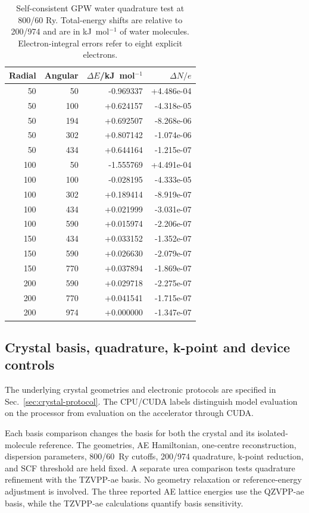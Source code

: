 \documentclass[10pt,a4paper]{article}
\begin{document}
\begin{table}[htbp]
\centering\small
\caption{Self-consistent GPW water quadrature test at 800/60 Ry. Total-energy shifts are relative to 200/974 and are in kJ~mol$^{-1}$ of water molecules. Electron-integral errors refer to eight explicit electrons.}
\label{tab:water-quadrature}
\begin{tabular}{rrrr}
\toprule
Radial & Angular & $\Delta E$/kJ~mol$^{-1}$ & $\Delta N/e$\\
\midrule
50 & 50 & -0.969337 & +4.486e-04 \\
50 & 100 & +0.624157 & -4.318e-05 \\
50 & 194 & +0.692507 & -8.268e-06 \\
50 & 302 & +0.807142 & -1.074e-06 \\
50 & 434 & +0.644164 & -1.215e-07 \\
100 & 50 & -1.555769 & +4.491e-04 \\
100 & 100 & -0.028195 & -4.333e-05 \\
100 & 302 & +0.189414 & -8.919e-07 \\
100 & 434 & +0.021999 & -3.031e-07 \\
100 & 590 & +0.015974 & -2.206e-07 \\
150 & 434 & +0.033152 & -1.352e-07 \\
150 & 590 & +0.026630 & -2.079e-07 \\
150 & 770 & +0.037894 & -1.869e-07 \\
200 & 590 & +0.029718 & -2.275e-07 \\
200 & 770 & +0.041541 & -1.715e-07 \\
200 & 974 & +0.000000 & -1.347e-07 \\
\bottomrule
\end{tabular}
\end{table}


\subsection{Crystal basis, quadrature, k-point and device controls}
\label{sec:crystal-numerical-controls}

The underlying crystal geometries and electronic protocols are specified in Sec.~\ref{sec:crystal-protocol}. The CPU/CUDA labels distinguish model evaluation on the processor from evaluation on the accelerator through CUDA.

\label{sec:urea-basis}
\label{sec:crystal-basis}
Each basis comparison changes the basis for both the crystal and its isolated-molecule reference. The geometries, AE Hamiltonian, one-centre reconstruction, dispersion parameters, 800/60~Ry cutoffs, 200/974 quadrature, k-point reduction, and SCF threshold are held fixed. A separate urea comparison tests quadrature refinement with the TZVPP-ae basis. No geometry relaxation or reference-energy adjustment is involved. The three reported AE lattice energies use the QZVPP-ae basis, while the TZVPP-ae calculations quantify basis sensitivity.
\end{document}
